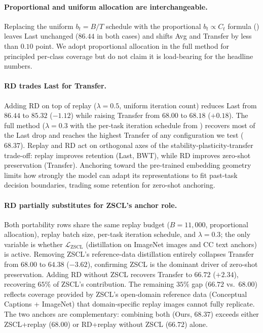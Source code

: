 \documentclass{article}
\begin{document}
  \paragraph{Proportional and uniform allocation are interchangeable.}
  Replacing the uniform $b_t = B/T$ schedule with the proportional
  $b_t \propto C_t$ formula () leaves Last unchanged
  ($86.44$ in both cases) and shifts Avg and Transfer by less than $0.10$ point.
  We adopt proportional allocation in the full method for principled per-class
  coverage but do not claim it is load-bearing for the headline numbers.

  \paragraph{RD trades Last for Transfer.}
  Adding RD on top of replay ($\lambda{=}0.5$, uniform iteration count) reduces
  Last from $86.44$ to $85.32$ ($-1.12$) while raising Transfer from $68.00$ to
  $68.18$ ($+0.18$). The full method ($\lambda{=}0.3$ with the per-task iteration
  schedule from ) recovers most of the Last drop and reaches
  the highest Transfer of any configuration we test ($68.37$). Replay and RD act
  on orthogonal axes of the stability-plasticity-transfer trade-off: replay
  improves retention (Last, BWT), while RD improves zero-shot preservation
  (Transfer). Anchoring toward the pre-trained embedding geometry limits how
  strongly the model can adapt its representations to fit past-task decision
  boundaries, trading some retention for zero-shot anchoring.

  \paragraph{RD partially substitutes for ZSCL's anchor role.}
  Both portability rows share the same replay budget ($B{=}11{,}000$, proportional allocation), replay batch size, per-task iteration schedule, and $\lambda{=}0.3$; the only variable is whether $\mathcal{L}_{\text{ZSCL}}$ (distillation on ImageNet images and CC text anchors) is active. 
  Removing ZSCL's reference-data distillation entirely collapses Transfer from
  $68.00$ to $64.38$ ($-3.62$), confirming ZSCL is the dominant driver of
  zero-shot preservation. Adding RD without ZSCL recovers Transfer to $66.72$
  ($+2.34$), recovering $65\%$ of ZSCL's contribution. The remaining $35\%$ gap
  ($66.72$ vs.\ $68.00$) reflects coverage provided by ZSCL's open-domain
  reference data (Conceptual Captions + ImageNet) that domain-specific replay
  images cannot fully replicate. The two anchors are complementary: combining both
  (Ours, $68.37$) exceeds either ZSCL+replay ($68.00$) or RD+replay without ZSCL
  ($66.72$) alone.
\end{document}
